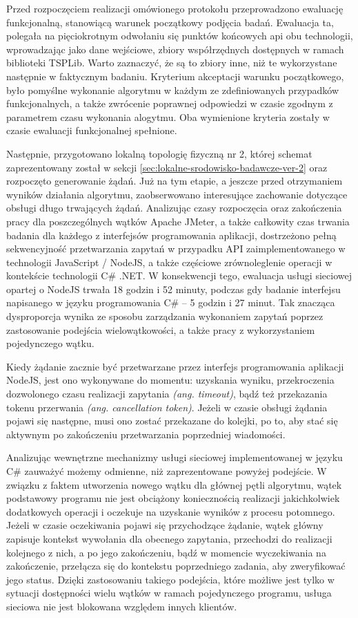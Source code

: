 Przed rozpoczęciem realizacji omówionego protokołu przeprowadzono ewaluację funkcjonalną, stanowiącą warunek początkowy podjęcia badań. Ewaluacja ta, polegała na pięciokrotnym odwołaniu się punktów końcowych api obu technologii, wprowadzając jako dane wejściowe, zbiory współrzędnych dostępnych w ramach biblioteki TSPLib. Warto zaznaczyć, że są to zbiory inne, niż te wykorzystane następnie w faktycznym badaniu. Kryterium akceptacji warunku początkowego, było pomyślne wykonanie algorytmu w każdym ze zdefiniowanych przypadków funkcjonalnych, a także zwrócenie poprawnej odpowiedzi w czasie zgodnym z parametrem czasu wykonania alogytmu. Oba wymienione kryteria zostały w czasie ewaluacji funkcjonalnej spełnione.

Następnie, przygotowano lokalną topologię fizyczną nr 2, której schemat zaprezentowany został w sekcji \ref{sec:lokalne-srodowisko-badawcze-ver-2} oraz rozpoczęto generowanie żądań. Już na tym etapie, a jeszcze przed otrzymaniem wyników działania algorytmu, zaobserwowano interesujące zachowanie dotyczące obsługi długo trwających żądań. Analizując czasy rozpoczęcia oraz zakończenia pracy dla poszczególnych wątków Apache JMeter, a także całkowity czas trwania badania dla każdego z interfejsów programowania aplikacji, dostrzeżono pełną sekwencyjność przetwarzania zapytań w przypadku API zaimplementowanego w technologii JavaScript / NodeJS, a także częściowe zrównoleglenie operacji w kontekście technologii C\# .NET. W konsekwencji tego, ewaluacja usługi sieciowej opartej o NodeJS trwała 18 godzin i 52 minuty, podczas gdy badanie interfejsu napisanego w języku programowania C\# -- 5 godzin i 27 minut. Tak znacząca dysproporcja wynika ze sposobu zarządzania wykonaniem zapytań poprzez zastosowanie podejścia wielowątkowości, a także pracy z wykorzystaniem pojedynczego wątku.

Kiedy żądanie zacznie być przetwarzane przez interfejs programowania aplikacji NodeJS, jest ono wykonywane do momentu: uzyskania wyniku, przekroczenia dozwolonego czasu realizacji zapytania \textit{(ang. timeout)}, bądź też przekazania tokenu przerwania \textit{(ang. cancellation token)}. Jeżeli w czasie obsługi żądania pojawi się następne, musi ono zostać przekazane do kolejki, po to, aby stać się aktywnym po zakończeniu przetwarzania poprzedniej wiadomości.

Analizując wewnętrzne mechanizmy usługi sieciowej implementowanej w języku C\# zauważyć możemy odmienne, niż zaprezentowane powyżej podejście. W związku z faktem utworzenia nowego wątku dla głównej pętli algorytmu, wątek podstawowy programu nie jest obciążony koniecznością realizacji jakichkolwiek dodatkowych operacji i oczekuje na uzyskanie wyników z procesu potomnego. Jeżeli w czasie oczekiwania pojawi się przychodzące żądanie, wątek główny zapisuje kontekst wywołania dla obecnego zapytania, przechodzi do realizacji kolejnego z nich, a po jego zakończeniu, bądź w momencie wyczekiwania na zakończenie, przełącza się do kontekstu poprzedniego zadania, aby zweryfikować jego status. Dzięki zastosowaniu takiego podejścia, które możliwe jest tylko w sytuacji dostępności wielu wątków w ramach pojedynczego programu, usługa sieciowa nie jest blokowana względem innych klientów.

